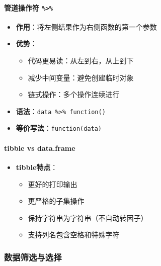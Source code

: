 \documentclass[
  twoside]{book}
\providecommand{\tightlist}{%
  \setlength{\itemsep}{0pt}\setlength{\parskip}{0pt}}
\begin{document}
\hypertarget{ux7ba1ux9053ux64cdux4f5cux7b26}{%
\paragraph{\texorpdfstring{管道操作符 \texttt{\%\textgreater{}\%}}{管道操作符 \%\textgreater\%}}\label{ux7ba1ux9053ux64cdux4f5cux7b26}}

\begin{itemize}
\tightlist
\item
  \textbf{作用}：将左侧结果作为右侧函数的第一个参数
\item
  \textbf{优势}：

  \begin{itemize}
  \tightlist
  \item
    代码更易读：从左到右，从上到下
  \item
    减少中间变量：避免创建临时对象
  \item
    链式操作：多个操作连续进行
  \end{itemize}
\item
  \textbf{语法}：\texttt{data\ \%\textgreater{}\%\ function()}
\item
  \textbf{等价写法}：\texttt{function(data)}
\end{itemize}

\hypertarget{tibble-vs-data.frame}{%
\paragraph{tibble vs data.frame}\label{tibble-vs-data.frame}}

\begin{itemize}
\tightlist
\item
  \textbf{tibble特点}：

  \begin{itemize}
  \tightlist
  \item
    更好的打印输出
  \item
    更严格的子集操作
  \item
    保持字符串为字符串（不自动转因子）
  \item
    支持列名包含空格和特殊字符
  \end{itemize}
\end{itemize}

\hypertarget{ux6570ux636eux7b5bux9009ux4e0eux9009ux62e9-1}{%
\subsubsection{数据筛选与选择}\label{ux6570ux636eux7b5bux9009ux4e0eux9009ux62e9-1}}
\end{document}
